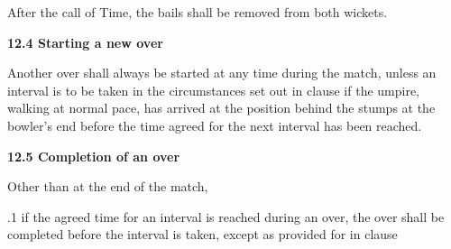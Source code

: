 \documentclass[12pt]{article}
\begin{document}
\vspace{\baselineskip}
{\fontsize{9pt}{10.8pt}\selectfont After the call of Time, the bails shall be removed from both wickets.\par}\par


\vspace{\baselineskip}
{\fontsize{11pt}{13.2pt}\selectfont \textbf{12.4 \tabto{0.47in} Starting a new over}\par}\par


\vspace{\baselineskip}
\begin{adjustwidth}{0.0in}{0.15in}
{\fontsize{9pt}{10.8pt}\selectfont Another over shall always be started at any time during the match, unless an interval is to be taken in the circumstances set out in clause if the umpire, walking at normal pace, has arrived at the position behind the stumps at the bowler’s end before the time agreed for the next interval has been reached.\par}\par

\end{adjustwidth}


\vspace{\baselineskip}

\vspace{\baselineskip}

\vspace{\baselineskip}

\vspace{\baselineskip}
\begin{Center}
{\fontsize{8pt}{9.6pt}\par}
\end{Center}\par


\vspace{\baselineskip}
{\fontsize{11pt}{13.2pt}\selectfont \textbf{12.5 \tabto{0.47in} Completion of an over}\par}\par


\vspace{\baselineskip}
{\fontsize{9pt}{10.8pt}\selectfont Other than at the end of the match,\par}\par


\vspace{\baselineskip}
\begin{adjustwidth}{0.5in}{0.04in}
{\fontsize{9pt}{10.8pt}.1 \tabto{0.49in} if the agreed time for an interval is reached during an over, the over shall be completed before the interval is taken, except as provided for in clause \par}\par

\end{adjustwidth}
\end{document}
